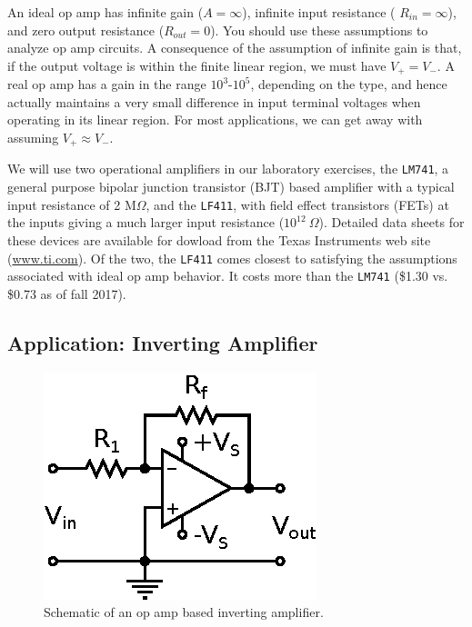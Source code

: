 \documentclass[11pt]{article}
\begin{document}
An ideal op amp has infinite gain ($A = \infty$), infinite input
resistance ( $R_{in} = \infty$), and zero output resistance
($R_{out} = 0$). You should use these assumptions to analyze op amp
circuits. A consequence of the assumption of infinite gain is that, if
the output voltage is within the finite linear region, we must have
$V_+ = V_-$. A real op amp has a gain in the range $10^3$-$10^5$,
depending on the type, and hence actually maintains a very small
difference in input terminal voltages when operating in its linear
region. For most applications, we can get away with assuming
$V_+ \approx V_-$.

We will use two operational amplifiers in our laboratory exercises,
the \texttt{LM741}, a general purpose bipolar junction transistor
(BJT) based amplifier with a typical input resistance of 2 M$\Omega $,
and the \texttt{LF411}, with field effect transistors (FETs) at the
inputs giving a much larger input resistance ($10^{12}~\Omega$).
Detailed data sheets for these devices are available for dowload from
the Texas Instruments web site (\url{www.ti.com}). Of the two, the
\texttt{LF411} comes closest to satisfying the assumptions associated
with ideal op amp behavior. It costs more than the \texttt{LM741}
(\$1.30 vs. \$0.73 as of fall 2017). 

\vspace{12 pt}
\noindent
{}

\subsection{Application: Inverting Amplifier}
\label{sec:invertingamp}

\begin{figure}[ht]
  \begin{center}
    \includegraphics{invertingamp.eps}
    \caption{Schematic of an op amp based inverting amplifier.}
    \label{fig:invertingamp}
  \end{center}
\end{figure}
\end{document}
